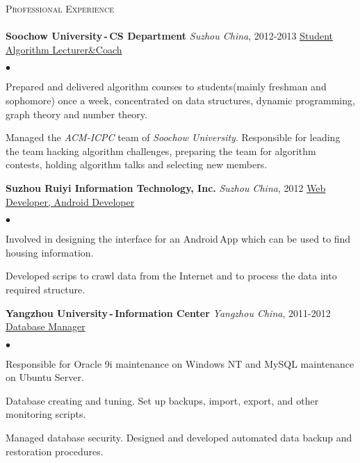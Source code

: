 \documentclass{article}
\newcommand{\lineunder}{\vspace*{-8pt} \\ \hspace*{-18pt} \hrulefill \\}
\newcommand{\header}[2]{{\hspace*{-15pt}\vspace*{6pt} \textsc{\large #1}\hfill{\footnotesize #2}} \vspace*{-6pt} \lineunder}
\newcommand{\employer}[4]{{ \textbf{#1} \emph{#2}, #3 \hfill \underline{#4}\\ }}
\newenvironment{achievements}{\begin{list}{$\bullet$}{\topsep 0pt \itemsep -2pt}}{\vspace*{4pt}\end{list}}
\begin{document}

\header{Professional Experience}{}

\employer{Soochow University\,-\,CS Department}{Suzhou China}{2012-2013} {Student Algorithm Lecturer\&Coach}
	\begin{achievements}
    \item Prepared and delivered algorithm courses to students(mainly freshman and sophomore) once a week, concentrated on
        data structures, dynamic programming, graph theory and number theory.
    \item Managed the \emph{ACM-ICPC} team of \emph{Soochow University}. Responsible for leading the team hacking algorithm
        challenges, preparing the team for algorithm contests, holding algorithm talks and selecting new members.
	\end{achievements}

\employer{Suzhou Ruiyi Information Technology, Inc.}{Suzhou China}{2012}{Web Developer, Android Developer}
	\begin{achievements}
    \item Involved in designing the interface for an Android\,App which can be used to find housing information.
	\item Developed scrips to crawl data from the Internet and to process the data into required structure.
	\end{achievements}

\employer{Yangzhou University\,-\,Information Center}{Yangzhou China}{2011-2012}{Database Manager}
	\begin{achievements}
    \item Responsible for Oracle 9i maintenance on Windows NT and MySQL maintenance on Ubuntu Server.
    \item Database creating and tuning. Set up backups, import, export, and other monitoring scripts.
    \item Managed database security. Designed and developed automated data backup and restoration procedures.

	\end{achievements}
\end{document}
